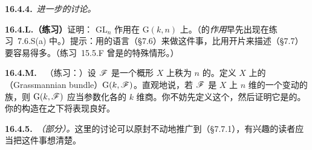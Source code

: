 \textbf{16.4.4.}\ \emph{进一步的讨论。}

\textbf{16.4.L.（练习）}\quad 证明：\trGroupScheme{} $\mathrm{GL}_n$ 作用在\trGrassmannian{} $\mathrm{G}(k,n)$ 上。（\trGroupScheme{}的\emph{作用}早先出现在\mbox{练习~7.6.S}(a) 中。）提示：用\trFunctor{}的语言（\S7.6）来做这件事，比用开片来描述\trGrassmannian{}（\S7.7）要容易得多。（\mbox{练习~15.5.F} 曾是\trProjectiveSpace{}的特殊情形。）

\textbf{16.4.M.}\ \extrahard\ （练习：\trGrassmannianBundle）\quad 设 $\mathscr{F}$ 是一个概形 $X$ 上秩为 $n$ 的\trLocallyFreeSheaf。定义 $X$ 上的\textbf{\trGrassmannianBundle}（Grassmannian bundle）$\mathrm{G}(k,\mathscr{F})$。直观地说，若 $\mathscr{F}$ 是 $X$ 上 $n$ 维\trVectorSpace{}的一个变动的族，则 $\mathrm{G}(k,\mathscr{F})$ 应当参数化各\trFiber{}的 $k$ 维商。你不妨先定义这个\trFunctor，然后证明它是\trRepresentable{}的。你的构造在\trBaseChange{}之下将表现良好。

\textbf{16.4.5.}\ \emph{（部分）\trFlagVariety。}\quad 这里的讨论可以原封不动地推广到\trPartialFlagVariety（\S7.7.1），有兴趣的读者应当把这件事想清楚。
